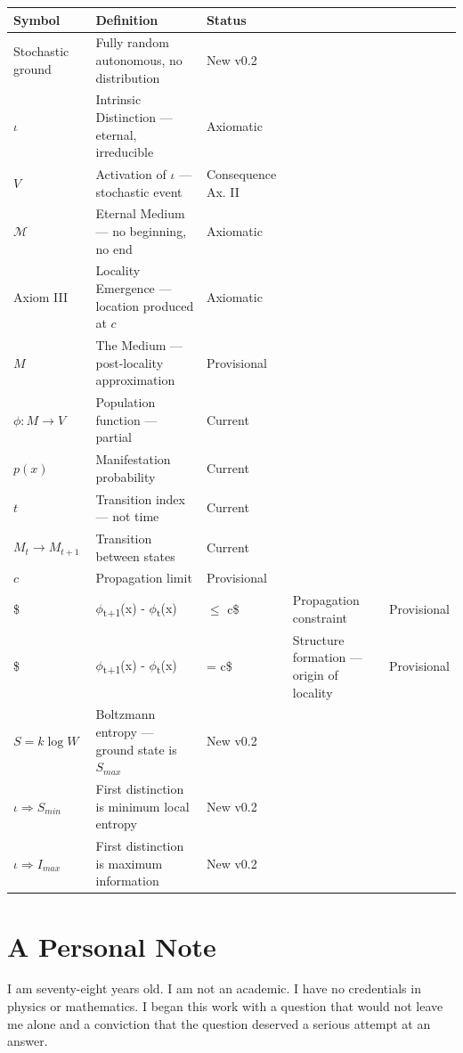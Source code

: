 \documentclass[11pt]{article}
\begin{document}
\begin{center}
\begin{tabular}{lll}
Symbol & Definition & Status\\
\hline
Stochastic ground & Fully random autonomous, no distribution & New v0.2\\
\(\iota\) & Intrinsic Distinction — eternal, irreducible & Axiomatic\\
\(V\) & Activation of \(\iota\) — stochastic event & Consequence Ax. II\\
\(\mathcal{M}\) & Eternal Medium — no beginning, no end & Axiomatic\\
Axiom III & Locality Emergence — location produced at \(c\) & Axiomatic\\
\(M\) & The Medium — post-locality approximation & Provisional\\
\(\phi : M \rightarrow V\) & Population function — partial & Current\\
\(p(x)\) & Manifestation probability & Current\\
\(t\) & Transition index — not time & Current\\
\(M_t \rightarrow M_{t+1}\) & Transition between states & Current\\
\(c\) & Propagation limit & Provisional\\
\$ & \(\phi\)\textsubscript{t+1}(x) - \(\phi\)\textsubscript{t}(x) & \(\le\) c\$ & Propagation constraint & Provisional\\
\$ & \(\phi\)\textsubscript{t+1}(x) - \(\phi\)\textsubscript{t}(x) & = c\$ & Structure formation — origin of locality & Provisional\\
\(S = k \log W\) & Boltzmann entropy — ground state is \(S_{max}\) & New v0.2\\
\(\iota \Rightarrow S_{min}\) & First distinction is minimum local entropy & New v0.2\\
\(\iota \Rightarrow I_{max}\) & First distinction is maximum information & New v0.2\\
\end{tabular}
\end{center}
\section{A Personal Note}
\label{sec:org5f7002c}

I am seventy-eight years old. I am not an academic. I have no credentials in
physics or mathematics. I began this work with a question that would not leave
me alone and a conviction that the question deserved a serious attempt at an
answer.
\end{document}
